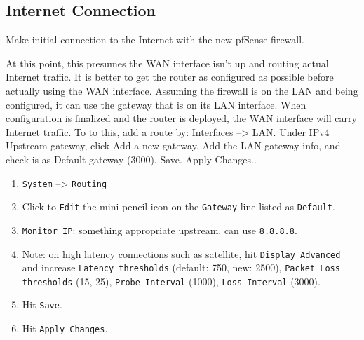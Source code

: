 \subsection{Internet Connection}
Make initial connection to the Internet with the new pfSense firewall.


At this point, this presumes the WAN interface isn't up and routing actual Internet traffic. It is better to get the router as configured as possible before actually using the WAN interface. Assuming the firewall is on the LAN and being configured, it can use the gateway that is on its LAN interface. When configuration is finalized and the router is deployed, the WAN interface will carry Internet traffic. To to this, add a route by: Interfaces --> LAN. Under IPv4 Upstream gateway, click Add a new gateway. Add the LAN gateway info, and check is as Default gateway (3000). Save. Apply Changes..

\begin{enumerate}
 \item \texttt{System} --> \texttt{Routing}
 \item Click to \texttt{Edit} the mini pencil icon on the \texttt{Gateway} line listed as \texttt{Default}.
 \item \texttt{Monitor IP}: something appropriate upstream, can use \texttt{8.8.8.8}.
 \item Note: on high latency connections such as satellite, hit \texttt{Display Advanced} and increase \texttt{Latency thresholds} (default: 750, new: 2500), \texttt{Packet Loss thresholds} (15, 25), \texttt{Probe Interval} (1000), \texttt{Loss Interval} (3000).
 \item Hit \texttt{Save}.
 \item Hit \texttt{Apply Changes}.
\end{enumerate}

